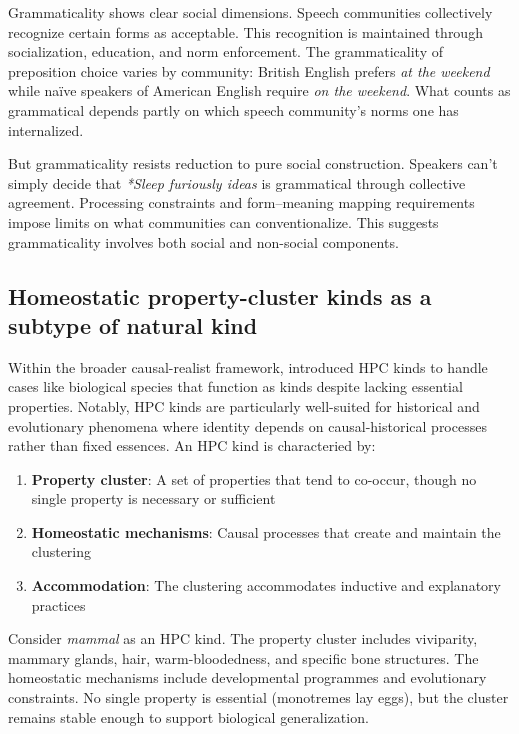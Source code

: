 \documentclass[12pt]{article}
\begin{document}
Grammaticality shows clear social dimensions. Speech communities collectively recognize certain forms as acceptable. This recognition is maintained through socialization, education, and norm enforcement. The grammaticality of preposition choice varies by community: British English prefers \textit{at the weekend} while naïve speakers of American English require \textit{on the weekend}. What counts as grammatical depends partly on which speech community's norms one has internalized.

But grammaticality resists reduction to pure social construction. Speakers can't simply decide that \textit{*Sleep furiously ideas} is grammatical through collective agreement. Processing constraints and form--meaning mapping requirements impose limits on what communities can conventionalize. This suggests grammaticality involves both social and non-social components.

\subsection{Homeostatic property-cluster kinds as a subtype of natural kind}

Within the broader causal-realist framework, \textcite{boyd1991realism} introduced HPC kinds to handle cases like biological species that function as kinds despite lacking essential properties. Notably, HPC kinds are particularly well-suited for historical and evolutionary phenomena where identity depends on causal-historical processes rather than fixed essences. An HPC kind is characteried by:

\begin{enumerate}
\item \textbf{Property cluster}: A set of properties that tend to co-occur, though no single property is necessary or sufficient
\item \textbf{Homeostatic mechanisms}: Causal processes that create and maintain the clustering
\item \textbf{Accommodation}: The clustering accommodates inductive and explanatory practices
\end{enumerate}

Consider \textit{mammal} as an HPC kind. The property cluster includes viviparity, mammary glands, hair, warm-bloodedness, and specific bone structures. The homeostatic mechanisms include developmental programmes and evolutionary constraints. No single property is essential (monotremes lay eggs), but the cluster remains stable enough to support biological generalization.
\end{document}
